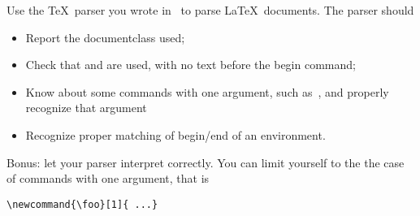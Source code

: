 Use the \TeX\ parser you wrote in \lex\ to parse
\LaTeX\ documents. The parser should
\begin{itemize}
\item Report the documentclass used;
\item Check that \verb++ and \verb++ are
  used, with no text before the begin command;
\item Know about some commands with one argument, such as~,
  and properly recognize that argument
\item Recognize proper matching of begin/end of an environment.
\end{itemize}
Bonus: let your parser interpret  correctly. You can
limit yourself to the the case of commands with one argument, that is
\begin{verbatim}
\newcommand{\foo}[1]{ ...}
\end{verbatim}

